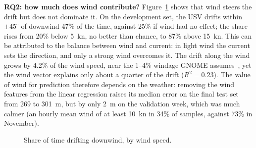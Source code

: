 \documentclass[sigconf]{acmart}
\begin{document}
\textbf{RQ2: how much does wind contribute?} Figure~\ref{fig:withwind} shows that wind steers the drift but does not dominate it. On the development set, the USV drifts within $\pm45^\circ$ of downwind 47\% of the time, against 25\% if wind had no effect; the share rises from 20\% below 5~kn, no better than chance, to 87\% above 15~kn. This can be attributed to the balance between wind and current: in light wind the current sets the direction, and only a strong wind overcomes it. The drift along the wind grows by 4.2\% of the wind speed, near the 1--4\% windage GNOME assumes~\cite{zelenke2012gnome}, yet the wind vector explains only about a quarter of the drift ($R^2 = 0.23$). The value of wind for prediction therefore depends on the weather: removing the wind features from the linear regression raises its median error on the final test set from 269 to 301~m, but by only 2~m on the validation week, which was much calmer (an hourly mean wind of at least 10~kn in 34\% of samples, against 73\% in November).

\begin{figure}[t]
\centering
{}
\caption{Share of time drifting downwind, by wind speed.}
\label{fig:withwind}
\end{figure}
\end{document}
